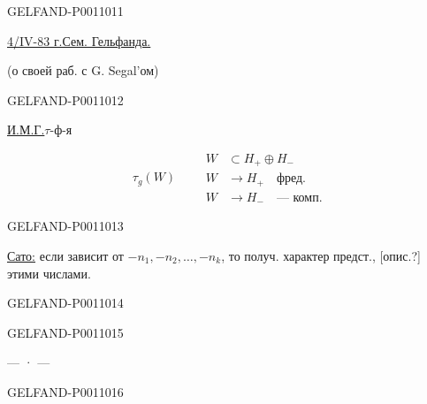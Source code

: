 \begin{GelfandAdjacentEvidence}{GELFAND-P001101}{1}
\begin{center}
\underline{4/IV-83 г.}\qquad\underline{Сем. Гельфанда.}\\[.3em]
\end{center}

(о своей раб. с G. Segal’ом)
\end{GelfandAdjacentEvidence}
\begin{GelfandAdjacentEvidence}{GELFAND-P001101}{2}


\underline{И.М.Г.}\quad $\tau$-ф-я

\[
\tau_g(W)\qquad
\begin{aligned}
W&\subset H_+\oplus H_-\\
W&\to H_+\quad\text{фред.}\\
W&\to H_-\quad\text{— комп.}
\end{aligned}
\]
\end{GelfandAdjacentEvidence}
\begin{GelfandAdjacentEvidence}{GELFAND-P001101}{3}


\underline{Сато:} если зависит от $-n_1,-n_2,\ldots,-n_k$,
то получ. характер предст., [опис.?] этими числами.
\end{GelfandAdjacentEvidence}
\begin{GelfandAdjacentEvidence}{GELFAND-P001101}{4}

\end{GelfandAdjacentEvidence}
\begin{GelfandAdjacentEvidence}{GELFAND-P001101}{5}


\begin{center}— · —\end{center}
\end{GelfandAdjacentEvidence}
\begin{GelfandAdjacentEvidence}{GELFAND-P001101}{6}


\end{GelfandAdjacentEvidence}
